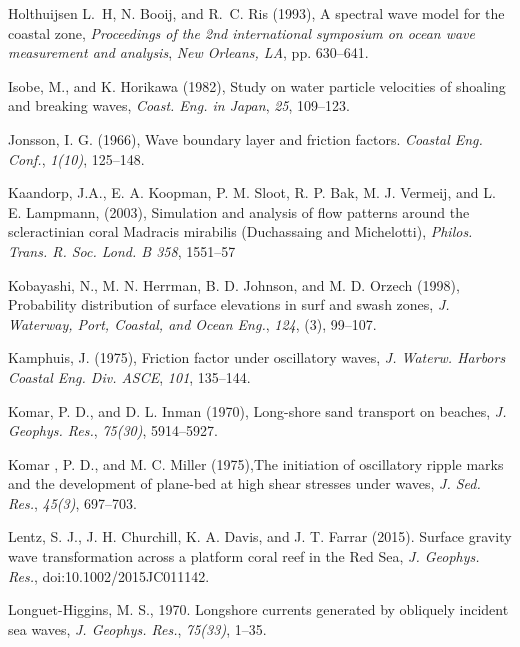\documentclass[default,jgrga]{agutex2015}
\begin{document}
\begin{article}
\begin{thebibliography}{}
Holthuijsen L.~H, N. Booij, and R.~C. Ris (1993), A spectral wave model for the coastal zone, \textit{Proceedings of the 2nd international symposium on ocean wave measurement and analysis}, \textit{New Orleans, LA}, pp. 630--641.

Isobe, M., and K. Horikawa (1982), Study on water particle velocities of shoaling and breaking waves,  \textit{Coast. Eng. in Japan},  \textit{25}, 109--123.

Jonsson, I. G. (1966), Wave boundary layer and friction factors. \textit{Coastal Eng. Conf.}, \textit{1(10)}, 125--148.

Kaandorp, J.A., E. A. Koopman, P. M. Sloot, R. P. Bak, M. J. Vermeij, and L. E. Lampmann, (2003), Simulation and analysis of flow patterns around the scleractinian coral Madracis mirabilis (Duchassaing and Michelotti), \textit{Philos. Trans. R. Soc. Lond. B 358}, 1551--57

Kobayashi, N., M. N. Herrman, B. D. Johnson, and M. D. Orzech (1998), Probability distribution of surface elevations in surf and swash zones, \textit{J. Waterway, Port, Coastal, and Ocean Eng.}, \textit{124}, (3), 99--107.

Kamphuis, J. (1975), Friction factor under oscillatory waves, \textit{J. Waterw. Harbors Coastal Eng. Div. ASCE}, \textit{101}, 135--144.

Komar, P. D., and D. L. Inman (1970), Long-shore sand transport on beaches, \textit{J. Geophys. Res.}, \textit{75(30)}, 5914--5927.

Komar , P. D., and M. C. Miller (1975),The initiation of oscillatory ripple marks and the development of plane-bed at high shear stresses under waves, \textit{J. Sed. Res.}, \textit{45(3)}, 697--703.

Lentz, S. J., J. H. Churchill, K. A. Davis, and J. T. Farrar (2015). Surface gravity wave transformation across a platform coral reef in the Red Sea, \textit{J. Geophys. Res.}, doi:10.1002/2015JC011142.

Longuet-Higgins, M. S., 1970. Longshore currents generated by obliquely incident sea waves, \textit{J. Geophys. Res.}, \textit{75(33)}, 1--35.


\end{thebibliography}
\end{article}
\end{document}
